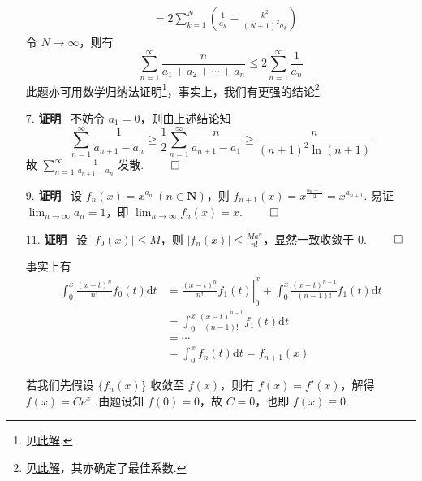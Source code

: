 \documentclass[11pt,oneside,fontset=fandol]{ctexbook} %
\begin{document}
\begin{enumerate}
\begin{align*}
        &= 2 \sum_{k=1}^N \left( \frac 1 {a_k} - \frac{k^2}{(N+1)^2 a_k} \right)
    \end{align*}
    令 $N \to \infty$，则有
    \[
        \sum_{n=1}^{\infty} \frac n {a_1 + a_2 + \cdots + a_n} \leqslant 2 \sum_{n=1}^{\infty} \frac 1 {a_n}
    \]
    此题亦可用数学归纳法证明\footnote{见\href{https://math.stackexchange.com/posts/108598/revisions}{此解}.}，事实上，我们有更强的结论\footnote{见\href{https://www.komal.hu/feladat?a=feladat&f=A709&l=en}{此解}，其亦确定了最佳系数.}.
    \item[7.]
    \textbf{证明} \ 不妨令 $a_1 = 0$，则由上述结论知
    \[
        \sum_{n=1}^{\infty} \frac 1 {a_{n+1} - a_n} \geqslant \frac 1 2 \sum_{n=1}^{\infty} \frac n {a_{n+1} - a_1} \geqslant \frac n {(n+1)^2 \ln(n+1)}
    \]
    故 $\sum_{n=1}^{\infty} \frac 1 {a_{n+1} - a_n}$ 发散.
    $\hfill\qed$
    \item[9.]
    \textbf{证明} \ 设 $f_n(x) = x^{a_n} \ (n \in \mathbf N)$，则 $f_{n+1}(x) = x^{\frac {a_n + 1} 2} = x^{a_{n+1}}$. 易证 $\lim_{n \to \infty} a_n = 1$，即 $\lim_{n \to \infty} f_n(x) = x$.
    $\hfill\qed$
    \item[11.]
    \textbf{证明} \ 设 $|f_0(x)| \leqslant M$，则 $|f_n(x)| \leqslant \frac{Ma^n}{n!}$，显然一致收敛于 $0$.
    $\hfill\qed$

    事实上有
    \begin{align*}
        \int_0^x \frac{(x-t)^n}{n!} f_0(t) \mathrm dt &= \left. \frac{(x-t)^n}{n!} f_1(t) \right|_0^x + \int_0^x \frac{(x-t)^{n-1}}{(n-1)!} f_1(t) \mathrm dt \\
        &= \int_0^x \frac{(x-t)^{n-1}}{(n-1)!} f_1(t) \mathrm dt \\
        &= \cdots \\
        &= \int_0^x f_n(t) \mathrm dt = f_{n+1}(x)
    \end{align*}

    若我们先假设 $\{ f_n(x) \}$ 收敛至 $f(x)$，则有 $f(x) = f'(x)$，解得 $f(x) = Ce^x$. 由题设知 $f(0) = 0$，故 $C = 0$，也即 $f(x) \equiv 0$.
\end{enumerate}
\end{document}
